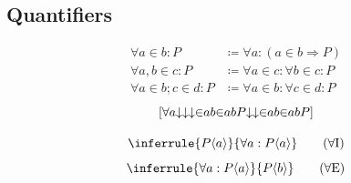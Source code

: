 \subsection{Quantifiers}

\newcommand{\norin}[2]{{\in}#1#2} %
\newcommand{\norforall}[2]{{\forall}#1#2} %
\begin{notation}
    \begin{align*}
        \forall a \in b: P &\coloneqq \forall a: (a \in b \Rightarrow P) \\
        \forall a, b \in c: P &\coloneqq \forall a \in c: \forall b \in c: P \\
        \forall a \in b; c \in d: P &\coloneqq \forall a \in b: \forall c \in d: P
    \end{align*}
    \[[\norforall{a}{\norimplies{\norin{a}{b}}{P}}]\]
\end{notation}

\begin{foundation}
    \begin{equation}
        \inferrule{P\bound{a}}{\forall a: P\bound{a}}
        \tag{{$\forall$}I}
        \label{rule:universal-introduction}
    \end{equation}
    \begin{equation}
        \inferrule{\forall a: P\bound{a}}{P\bound{b}}
        \tag{{$\forall$}E}
        \label{rule:universal-elimination}
    \end{equation}
\end{foundation}

